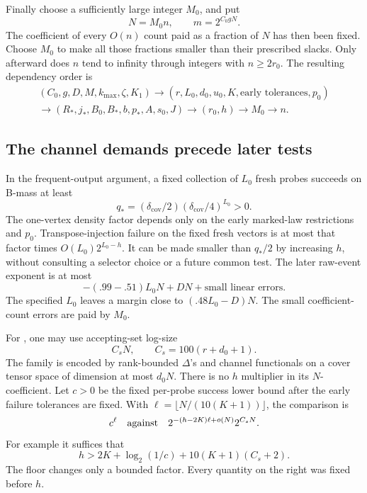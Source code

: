Finally choose a sufficiently large integer \(M_0\), and put
\begin{equation}
                  N=M_0n,\qquad m=2^{C_0gN}.
 \label{eq:ledger-final-dimensions}
\end{equation}
The coefficient of every \(O(n)\) count paid as a fraction of \(N\)
has then been fixed. Choose \(M_0\) to make all those fractions
smaller than their prescribed slacks. Only afterward does \(n\)
tend to infinity through integers with \(n\ge2r_0\).
The resulting dependency order is
\[
 \begin{gathered}
 (C_0,g,D,M,k_{\max},\zeta,K_1)
 \longrightarrow
 (r,L_0,d_0,u_0,K,\text{early tolerances},p_0)\\
 \longrightarrow
 (R_*,j_*,B_0,B_*,b,p_*,A,s_0,J)
 \longrightarrow(r_0,h)
 \longrightarrow M_0
 \longrightarrow n .
 \end{gathered}
\]

\subsection{The channel demands precede later tests}

In the frequent-output argument, a fixed collection of \(L_0\)
fresh probes succeeds on B-mass at least
\begin{equation}
       q_*=(\delta_{\mathrm{cov}}/2)
              (\delta_{\mathrm{cov}}/4)^{L_0}>0.
 \label{eq:ledger-probe-mass}
\end{equation}
The one-vertex density factor depends only on the early marked-law
restrictions and \(p_0\).
Transpose-injection failure on the fixed fresh vectors is at most
that factor times \(O(L_0)2^{L_0-h}\).
It can be made smaller than \(q_*/2\) by increasing \(h\), without
consulting a selector choice or a future common test.
The later raw-event exponent is at most
\[
       -(.99-.51)L_0N+DN+\text{small linear errors}.
\]
The specified \(L_0\) leaves a margin close to \((.48L_0-D)N\).
The small coefficient-count errors are paid by \(M_0\).

For , one may use accepting-set log-size
\begin{equation}
                       C_sN,\qquad C_s=100(r+d_0+1).
 \label{eq:ledger-accepting-family}
\end{equation}
The family is encoded by rank-bounded \(\Delta\)'s and channel
functionals on a cover tensor space of dimension at most \(d_0N\).
There is no \(h\) multiplier in its \(N\)-coefficient.
Let \(c>0\) be the fixed per-probe success lower bound after the early
failure tolerances are fixed.
With \(\ell=\lfloor N/(10(K+1))\rfloor\), the comparison is
\[
       c^\ell
       \quad\hbox{against}\quad
       2^{-(h-2K)\ell+o(N)}2^{C_sN}.
\]
For example it suffices that
\begin{equation}
 h>2K+\log_2(1/c)+10(K+1)(C_s+2).
 \label{eq:ledger-injection-demand}
\end{equation}
The floor changes only a bounded factor. Every quantity on the right
was fixed before \(h\).

